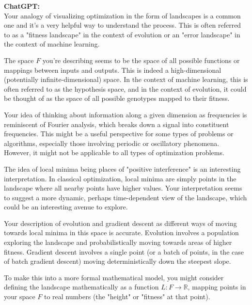 \documentclass{article}[10pt]
\begin{document}
\noindent \textbf{ChatGPT:}\\
Your analogy of visualizing optimization in the form of landscapes is a common one and it's a very helpful way to understand the process. 
This is often referred to as a "fitness landscape" in the context of evolution or an "error landscape" in the context of machine learning.\par

The space \( F \) you're describing seems to be the space of all possible functions or mappings between inputs and outputs. 
This is indeed a high-dimensional (potentially infinite-dimensional) space. 
In the context of machine learning, this is often referred to as the hypothesis space, and in the context of evolution, it could be thought of as the space of all possible genotypes mapped to their fitness.\par

Your idea of thinking about information along a given dimension as frequencies is reminiscent of Fourier analysis, which breaks down a signal into constituent frequencies. 
This might be a useful perspective for some types of problems or algorithms, especially those involving periodic or oscillatory phenomena. 
However, it might not be applicable to all types of optimization problems.\par

The idea of local minima being places of "positive interference" is an interesting interpretation. 
In classical optimization, local minima are simply points in the landscape where all nearby points have higher values. 
Your interpretation seems to suggest a more dynamic, perhaps time-dependent view of the landscape, which could be an interesting avenue to explore.\par

Your description of evolution and gradient descent as different ways of moving towards local minima in this space is accurate. 
Evolution involves a population exploring the landscape and probabilistically moving towards areas of higher fitness. 
Gradient descent involves a single point (or a batch of points, in the case of batch gradient descent) moving deterministically down the steepest slope.\par

To make this into a more formal mathematical model, you might consider defining the landscape mathematically as a function \( L: F \rightarrow \mathbb{R} \), mapping points in your space \( F \) to real numbers (the "height" or "fitness" at that point).\par 
\end{document}
